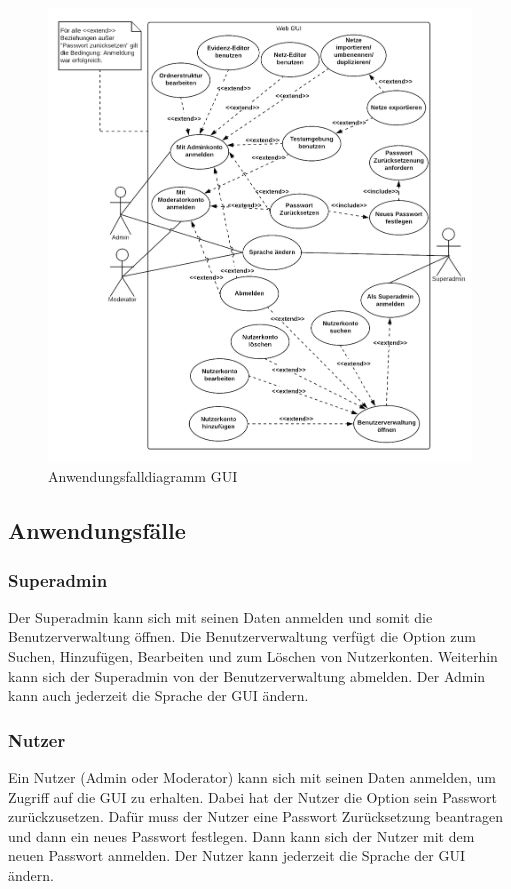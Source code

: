 \documentclass[parskip=full,11pt,twoside]{scrartcl}
\begin{document}
\begin{figure}[ht!]
\includegraphics[width=\textwidth,height=\textheight,keepaspectratio]{image/PSEAFv2.png}
   \caption{Anwendungsfalldiagramm GUI}
   \label{fig:af1}
\end{figure}
\pagebreak

\subsection{Anwendungsfälle}

\subsubsection{Superadmin}
Der Superadmin kann sich mit seinen Daten anmelden und somit die Benutzerverwaltung öffnen. Die Benutzerverwaltung verfügt die Option zum Suchen, Hinzufügen, Bearbeiten und zum Löschen von Nutzerkonten. Weiterhin kann sich der Superadmin von der Benutzerverwaltung abmelden. Der Admin kann auch jederzeit die Sprache der GUI ändern. 
\subsubsection{Nutzer}
Ein Nutzer (Admin oder Moderator) kann sich mit seinen Daten anmelden, um Zugriff auf die GUI zu erhalten. Dabei hat der Nutzer die Option sein Passwort zurückzusetzen. Dafür muss der Nutzer eine Passwort Zurücksetzung beantragen und dann ein neues Passwort festlegen. Dann kann sich der Nutzer mit dem neuen Passwort anmelden. Der Nutzer kann jederzeit die Sprache der GUI ändern.
\end{document}
